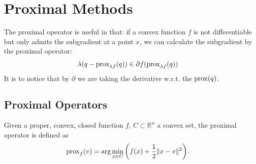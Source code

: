 \newpage
\section{Proximal Methods}
The proximal operator is useful in that: if a convex function $f$ is not differentiable but only admits the subgradient at a point $x$, we can calculate the subgradient by the proximal operator:
\begin{equation*}
    \lambda (q - \operatorname*{prox}\nolimits_{\lambda f}(q) ) \in \partial f(\operatorname*{prox}\nolimits_{\lambda f}(q))
\end{equation*}
It is to notice that by $\partial$ we are taking the derivative w.r.t. the $\operatorname*{prox} (q)$.
\subsection{Proximal Operators}
\begin{definition}
	Given a proper, convex, closed function $f$, $C \subset \mathbb{R}^n $ a convex set, the proximal operator is defined as
	\begin{align*}
		\operatorname*{prox}\nolimits_f (v) = \arg \min_{x \in C} \bigg(f(x) + \frac{1}{2} \|x - v\|^2 \bigg).
	\end{align*}
\end{definition}

